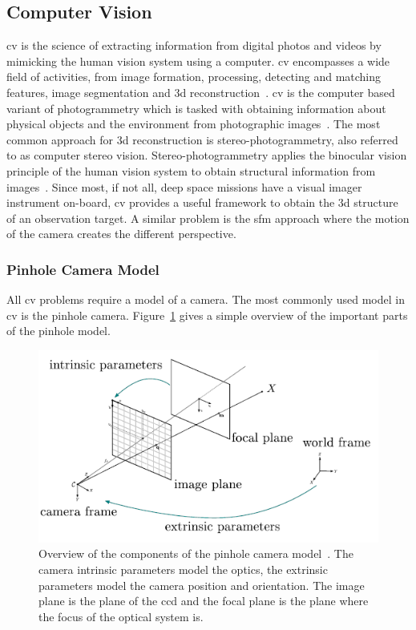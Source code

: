 \subsection{Computer Vision} \label{sec:t_cv}
\Gls{cv} is the science of extracting information from digital photos and videos by mimicking the human vision system using a computer. \Gls{cv} encompasses a wide field of activities, from image formation, processing, detecting and matching features, image segmentation and \gls{3d} reconstruction~\cite{szeliski2010computer}. \Gls{cv} is the computer based variant of photogrammetry which is tasked with obtaining information about physical objects and the environment from photographic images~\cite{Kasser2002DigitalPhotogrammetry}. The most common approach for \gls{3d} reconstruction is stereo-photogrammetry, also referred to as computer stereo vision. Stereo-photogrammetry applies the binocular vision principle of the human vision system to obtain structural information from images~\cite{do2019review}. Since most, if not all, deep space missions have a visual imager instrument on-board, \gls{cv} provides a useful framework to obtain the \gls{3d} structure of an observation target. A similar problem is the \gls{sfm} approach where the motion of the camera creates the different perspective.

\subsubsection{Pinhole Camera Model}
All \gls{cv} problems require a model of a camera. The most commonly used model in \gls{cv} is the pinhole camera. Figure~\ref{fig:pinhole_cam} gives a simple overview of the important parts of the pinhole model.

\begin{figure}[htb]
    \centering
    \includegraphics[width=\textwidth]{doc/thesis/0_figures/sfm/pinholeCamera.png}
    \caption{Overview of the components of the pinhole camera model~\cite{openMVG}. The camera intrinsic parameters model the optics, the extrinsic parameters model the camera position and orientation. The image plane is the plane of the \gls{ccd} and the focal plane is the plane where the focus of the optical system is.}
    \label{fig:pinhole_cam}
\end{figure} 

